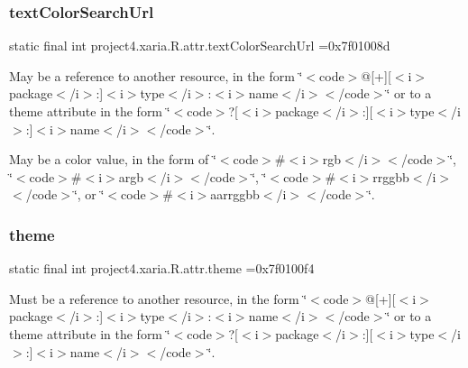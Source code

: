 \subsubsection{\texorpdfstring{text\+Color\+Search\+Url}{textColorSearchUrl}}
{\footnotesize\ttfamily static final int project4.\+xaria.\+R.\+attr.\+text\+Color\+Search\+Url =0x7f01008d\hspace{0.3cm}{\ttfamily [static]}}

May be a reference to another resource, in the form \char`\"{}$<$code$>$@\mbox{[}+\mbox{]}\mbox{[}$<$i$>$package$<$/i$>$\+:\mbox{]}$<$i$>$type$<$/i$>$\+:$<$i$>$name$<$/i$>$$<$/code$>$\char`\"{} or to a theme attribute in the form \char`\"{}$<$code$>$?\mbox{[}$<$i$>$package$<$/i$>$\+:\mbox{]}\mbox{[}$<$i$>$type$<$/i$>$\+:\mbox{]}$<$i$>$name$<$/i$>$$<$/code$>$\char`\"{}. 

May be a color value, in the form of \char`\"{}$<$code$>$\#$<$i$>$rgb$<$/i$>$$<$/code$>$\char`\"{}, \char`\"{}$<$code$>$\#$<$i$>$argb$<$/i$>$$<$/code$>$\char`\"{}, \char`\"{}$<$code$>$\#$<$i$>$rrggbb$<$/i$>$$<$/code$>$\char`\"{}, or \char`\"{}$<$code$>$\#$<$i$>$aarrggbb$<$/i$>$$<$/code$>$\char`\"{}. \mbox{\label{classproject4_1_1xaria_1_1R_1_1attr_a3a1cfb55c7674dd47bf8a98e450fd555}} 
\subsubsection{\texorpdfstring{theme}{theme}}
{\footnotesize\ttfamily static final int project4.\+xaria.\+R.\+attr.\+theme =0x7f0100f4\hspace{0.3cm}{\ttfamily [static]}}

Must be a reference to another resource, in the form \char`\"{}$<$code$>$@\mbox{[}+\mbox{]}\mbox{[}$<$i$>$package$<$/i$>$\+:\mbox{]}$<$i$>$type$<$/i$>$\+:$<$i$>$name$<$/i$>$$<$/code$>$\char`\"{} or to a theme attribute in the form \char`\"{}$<$code$>$?\mbox{[}$<$i$>$package$<$/i$>$\+:\mbox{]}\mbox{[}$<$i$>$type$<$/i$>$\+:\mbox{]}$<$i$>$name$<$/i$>$$<$/code$>$\char`\"{}. \mbox{\label{classproject4_1_1xaria_1_1R_1_1attr_ae1315bb2ab86268cdec026c156603d77}} 
